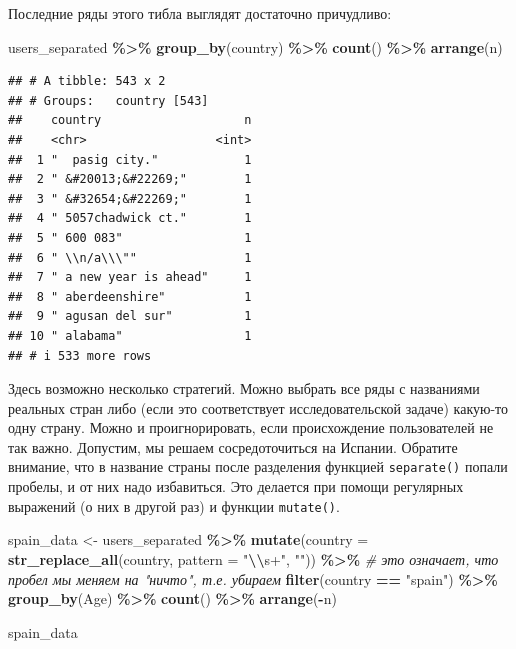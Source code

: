 \documentclass[
]{book}
\newenvironment{Shaded}{\begin{snugshade}}{\end{snugshade}}
\newcommand{\AttributeTok}[1]{\textcolor[rgb]{0.13,0.29,0.53}{#1}}
\newcommand{\CommentTok}[1]{\textcolor[rgb]{0.56,0.35,0.01}{\textit{#1}}}
\newcommand{\FunctionTok}[1]{\textcolor[rgb]{0.13,0.29,0.53}{\textbf{#1}}}
\newcommand{\NormalTok}[1]{#1}
\newcommand{\OtherTok}[1]{\textcolor[rgb]{0.56,0.35,0.01}{#1}}
\newcommand{\SpecialCharTok}[1]{\textcolor[rgb]{0.81,0.36,0.00}{\textbf{#1}}}
\newcommand{\StringTok}[1]{\textcolor[rgb]{0.31,0.60,0.02}{#1}}
\theoremstyle{definition}
\theoremstyle{definition}
\theoremstyle{definition}
\theoremstyle{definition}
\theoremstyle{remark}
\begin{document}
Последние ряды этого тибла выглядят достаточно причудливо:

\begin{Shaded}
\begin{Highlighting}[]
\NormalTok{users\_separated }\SpecialCharTok{\%\textgreater{}\%} 
  \FunctionTok{group\_by}\NormalTok{(country) }\SpecialCharTok{\%\textgreater{}\%}
  \FunctionTok{count}\NormalTok{() }\SpecialCharTok{\%\textgreater{}\%} 
  \FunctionTok{arrange}\NormalTok{(n)}
\end{Highlighting}
\end{Shaded}

\begin{verbatim}
## # A tibble: 543 x 2
## # Groups:   country [543]
##    country                    n
##    <chr>                  <int>
##  1 "  pasig city."            1
##  2 " &#20013;&#22269;"        1
##  3 " &#32654;&#22269;"        1
##  4 " 5057chadwick ct."        1
##  5 " 600 083"                 1
##  6 " \\n/a\\\""               1
##  7 " a new year is ahead"     1
##  8 " aberdeenshire"           1
##  9 " agusan del sur"          1
## 10 " alabama"                 1
## # i 533 more rows
\end{verbatim}

Здесь возможно несколько стратегий. Можно выбрать все ряды с названиями реальных стран либо (если это соответствует исследовательской задаче) какую-то одну страну. Можно и проигнорировать, если происхождение пользователей не так важно. Допустим, мы решаем сосредоточиться на Испании. Обратите внимание, что в название страны после разделения функцией \texttt{separate()} попали пробелы, и от них надо избавиться. Это делается при помощи регулярных выражений (о них в другой раз) и функции \texttt{mutate()}.

\begin{Shaded}
\begin{Highlighting}[]
\NormalTok{spain\_data }\OtherTok{\textless{}{-}}\NormalTok{ users\_separated }\SpecialCharTok{\%\textgreater{}\%}
  \FunctionTok{mutate}\NormalTok{(}\AttributeTok{country =} \FunctionTok{str\_replace\_all}\NormalTok{(country, }\AttributeTok{pattern =} \StringTok{"}\SpecialCharTok{\textbackslash{}\textbackslash{}}\StringTok{s+"}\NormalTok{, }\StringTok{""}\NormalTok{)) }\SpecialCharTok{\%\textgreater{}\%} \CommentTok{\# это означает, что пробел мы меняем на "ничто", т.е. убираем}
  \FunctionTok{filter}\NormalTok{(country }\SpecialCharTok{==} \StringTok{"spain"}\NormalTok{) }\SpecialCharTok{\%\textgreater{}\%} 
  \FunctionTok{group\_by}\NormalTok{(Age) }\SpecialCharTok{\%\textgreater{}\%}
  \FunctionTok{count}\NormalTok{() }\SpecialCharTok{\%\textgreater{}\%} 
  \FunctionTok{arrange}\NormalTok{(}\SpecialCharTok{{-}}\NormalTok{n)}

\NormalTok{spain\_data }
\end{Highlighting}
\end{Shaded}
\end{document}
